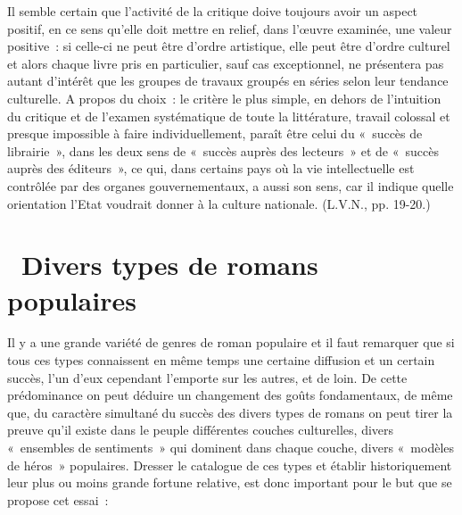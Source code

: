 \documentclass[french,twoside]{book} %
\begin{document}
 Il semble certain que l’activité de la critique doive toujours avoir un aspect positif, en ce sens qu’elle doit mettre en relief, dans l’œuvre examinée, une valeur positive : si celle-ci ne peut être d’ordre artistique, elle peut être d’ordre culturel et alors chaque livre pris en particulier, sauf cas exceptionnel, ne présentera pas autant d’intérêt que les groupes de travaux groupés en séries selon leur tendance culturelle. A propos du choix : le critère le plus simple, en dehors de l’intuition du critique et de l’examen systématique de toute la littérature, travail colossal et presque impossible à faire individuellement, paraît être celui du « succès de librairie », dans les deux sens de « succès auprès des lecteurs » et de « succès auprès des éditeurs », ce qui, dans certains pays où la vie intellectuelle est contrôlée par des organes gouvernementaux, a aussi son sens, car il indique quelle orientation l’Etat voudrait donner à la culture nationale. (L.V.N., pp. 19-20.)\par
{\raggedleft \noindent [1934]}
\section[{ Divers types de romans populaires}]{ Divers types de romans populaires}
\noindent Il y a une grande variété de genres de roman populaire et il faut remarquer que si tous ces types connaissent en même temps une certaine diffusion et un certain succès, l’un d’eux cependant l’emporte sur les autres, et de loin. De cette prédominance on peut déduire un changement des goûts fondamentaux, de même que, du caractère simultané du succès des divers types de romans on peut tirer la preuve qu’il existe dans le peuple différentes couches culturelles, divers « ensembles de sentiments » qui dominent dans chaque couche, divers « modèles de héros » populaires. Dresser le catalogue de ces types et établir historiquement leur plus ou moins grande fortune relative, est donc important pour le but que se propose cet essai :\par
\end{document}
